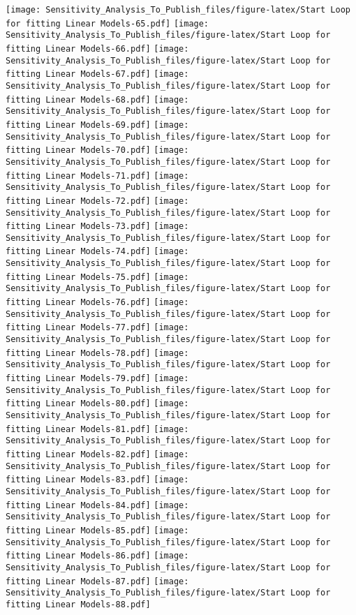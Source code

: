 \documentclass[
]{article}
\begin{document}
\texttt{[image: Sensitivity\_Analysis\_To\_Publish\_files/figure-latex/Start Loop for fitting Linear Models-65.pdf]}
\texttt{[image: Sensitivity\_Analysis\_To\_Publish\_files/figure-latex/Start Loop for fitting Linear Models-66.pdf]}
\texttt{[image: Sensitivity\_Analysis\_To\_Publish\_files/figure-latex/Start Loop for fitting Linear Models-67.pdf]}
\texttt{[image: Sensitivity\_Analysis\_To\_Publish\_files/figure-latex/Start Loop for fitting Linear Models-68.pdf]}
\texttt{[image: Sensitivity\_Analysis\_To\_Publish\_files/figure-latex/Start Loop for fitting Linear Models-69.pdf]}
\texttt{[image: Sensitivity\_Analysis\_To\_Publish\_files/figure-latex/Start Loop for fitting Linear Models-70.pdf]}
\texttt{[image: Sensitivity\_Analysis\_To\_Publish\_files/figure-latex/Start Loop for fitting Linear Models-71.pdf]}
\texttt{[image: Sensitivity\_Analysis\_To\_Publish\_files/figure-latex/Start Loop for fitting Linear Models-72.pdf]}
\texttt{[image: Sensitivity\_Analysis\_To\_Publish\_files/figure-latex/Start Loop for fitting Linear Models-73.pdf]}
\texttt{[image: Sensitivity\_Analysis\_To\_Publish\_files/figure-latex/Start Loop for fitting Linear Models-74.pdf]}
\texttt{[image: Sensitivity\_Analysis\_To\_Publish\_files/figure-latex/Start Loop for fitting Linear Models-75.pdf]}
\texttt{[image: Sensitivity\_Analysis\_To\_Publish\_files/figure-latex/Start Loop for fitting Linear Models-76.pdf]}
\texttt{[image: Sensitivity\_Analysis\_To\_Publish\_files/figure-latex/Start Loop for fitting Linear Models-77.pdf]}
\texttt{[image: Sensitivity\_Analysis\_To\_Publish\_files/figure-latex/Start Loop for fitting Linear Models-78.pdf]}
\texttt{[image: Sensitivity\_Analysis\_To\_Publish\_files/figure-latex/Start Loop for fitting Linear Models-79.pdf]}
\texttt{[image: Sensitivity\_Analysis\_To\_Publish\_files/figure-latex/Start Loop for fitting Linear Models-80.pdf]}
\texttt{[image: Sensitivity\_Analysis\_To\_Publish\_files/figure-latex/Start Loop for fitting Linear Models-81.pdf]}
\texttt{[image: Sensitivity\_Analysis\_To\_Publish\_files/figure-latex/Start Loop for fitting Linear Models-82.pdf]}
\texttt{[image: Sensitivity\_Analysis\_To\_Publish\_files/figure-latex/Start Loop for fitting Linear Models-83.pdf]}
\texttt{[image: Sensitivity\_Analysis\_To\_Publish\_files/figure-latex/Start Loop for fitting Linear Models-84.pdf]}
\texttt{[image: Sensitivity\_Analysis\_To\_Publish\_files/figure-latex/Start Loop for fitting Linear Models-85.pdf]}
\texttt{[image: Sensitivity\_Analysis\_To\_Publish\_files/figure-latex/Start Loop for fitting Linear Models-86.pdf]}
\texttt{[image: Sensitivity\_Analysis\_To\_Publish\_files/figure-latex/Start Loop for fitting Linear Models-87.pdf]}
\texttt{[image: Sensitivity\_Analysis\_To\_Publish\_files/figure-latex/Start Loop for fitting Linear Models-88.pdf]}
\end{document}
